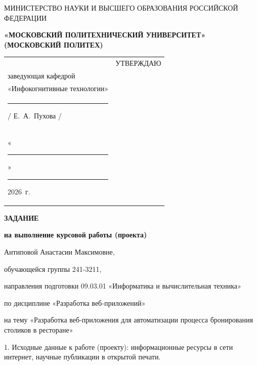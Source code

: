 \documentclass[14pt, a4paper]{extarticle}
\begin{document}
\pagestyle{empty}


\begin{center}
    {\small МИНИСТЕРСТВО НАУКИ И ВЫСШЕГО ОБРАЗОВАНИЯ РОССИЙСКОЙ ФЕДЕРАЦИИ}


    {\small \textbf{«МОСКОВСКИЙ ПОЛИТЕХНИЧЕСКИЙ УНИВЕРСИТЕТ»}} \\
    {\small \textbf{(МОСКОВСКИЙ ПОЛИТЕХ)}}
\end{center}

\begin{tabularx}{\textwidth}{@{} p{} p{} @{}}
     &
    \raggedright
    УТВЕРЖДАЮ                          \\
    заведующая кафедрой                \\
    «Инфокогнитивные технологии»       \\[0.3cm]

    \rule{3cm}{0.4pt} / Е.~А.~Пухова / \\[0.1cm]

    «\rule{0.8cm}{0.4pt}» \rule{3cm}{0.4pt} 2026~г.
\end{tabularx}


\begin{center}

    { \large \textbf{ЗАДАНИЕ}}

    \textbf{на выполнение курсовой работы (проекта)}

    Антиповой Анастасии Максимовне, %

\end{center}

обучающейся группы 241-3211,

направления подготовки 09.03.01 «Информатика и вычислительная техника»

по дисциплине «Разработка веб-приложений»

на тему «Разработка веб-приложения для автоматизации процесса бронирования столиков в ресторане»

1. Исходные данные к работе (проекту): информационные ресурсы в сети
интернет, научные публикации в открытой печати.
\end{document}
